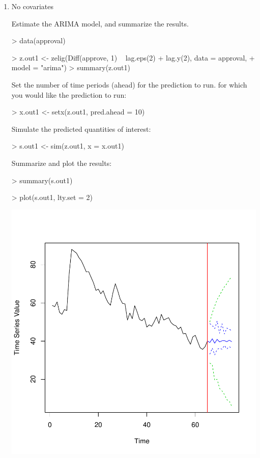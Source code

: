 \begin{enumerate}

\item No covariates\newline

Estimate the ARIMA model, and summarize the results.
\begin{Schunk}
\begin{Sinput}
> data(approval)
\end{Sinput}
\end{Schunk}
\begin{Schunk}
\begin{Sinput}
> z.out1 <- zelig(Diff(approve, 1) ~ lag.eps(2) + lag.y(2), data = approval, 
+     model = "arima")
> summary(z.out1)
\end{Sinput}
\end{Schunk}
Set the number of time periods (ahead) for the prediction to run.
for which you would like the prediction to run:
\begin{Schunk}
\begin{Sinput}
> x.out1 <- setx(z.out1, pred.ahead = 10)
\end{Sinput}
\end{Schunk}
Simulate the predicted quantities of interest:
\begin{Schunk}
\begin{Sinput}
> s.out1 <- sim(z.out1, x = x.out1)
\end{Sinput}
\end{Schunk}
Summarize and plot the results:
\begin{Schunk}
\begin{Sinput}
> summary(s.out1)
\end{Sinput}
\end{Schunk}
\begin{center}
\begin{Schunk}
\begin{Sinput}
> plot(s.out1, lty.set = 2)
\end{Sinput}
\end{Schunk}
\includegraphics{vigpics/arima-Example1Plot}

\end{center}
\end{enumerate}
